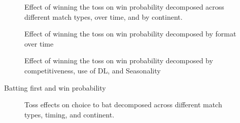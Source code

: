 \documentclass[11pt,  letterpaper]{article}
\begin{document}
\begin{figure}[b]
  \centering
  \caption{Effect of winning the toss on win probability decomposed across different match types, over time, and by continent.}
  \label{fig:rf_het_TE}
\end{figure}


\begin{figure}[b]
  \centering
  \caption{Effect of winning the toss on win probability decomposed by format over time}
  \label{fig:rf_het_TE2}
\end{figure}

\begin{figure}[b]
  \centering
  \caption{Effect of winning the toss on win probability decomposed by competitiveness, use of DL, and Seasonality}
  \label{fig:rf_het_TE3}
\end{figure}

\clearpage

\begin{table}
\scriptsize
\centering
\caption{Batting first and win probability}

\label{table:iv_table}
\end{table}


\begin{figure}
 \centering
 \caption{Toss effects on choice to bat decomposed across different match
 types, timing, and continent.}
 \label{fig:fs_het_TE1}
\end{figure}
\end{document}
